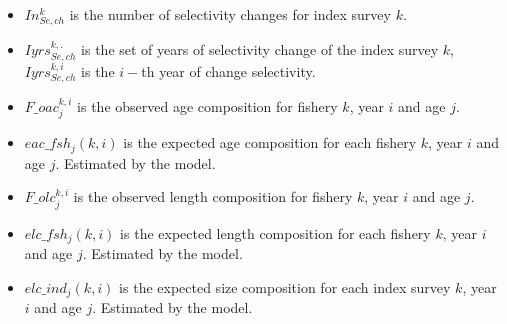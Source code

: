 \documentclass{article}
\begin{document}
\begin{itemize}
    
    \item $In_{Se,ch}^k$ is the number of selectivity changes for index survey $k$.
    \item $Iyrs_{Se,ch}^{k,.}$ is the set of years of selectivity change of the index survey $k$, $Iyrs_{Se,ch}^{k,i}$ is the $i-$th year of change selectivity.
   
    \item $F\_oac^{k,i}_j$ is the observed age composition for fishery $k$, year $i$ and age $j$.
    \item $eac\_fsh_j(k,i)$ is the expected age composition for each fishery $k$, year $i$ and age $j$. Estimated by the model.
    
    \item $F\_olc^{k,i}_j$ is the observed length composition for fishery $k$, year $i$ and age $j$.
    \item $elc\_fsh_j(k,i)$ is the expected length composition for each fishery $k$, year $i$ and age $j$. Estimated by the model.
    
    \item $elc\_ind_j(k,i)$ is the expected size composition for each index survey $k$, year $i$ and age $j$. Estimated by the model.
    

\end{itemize}
\end{document}
